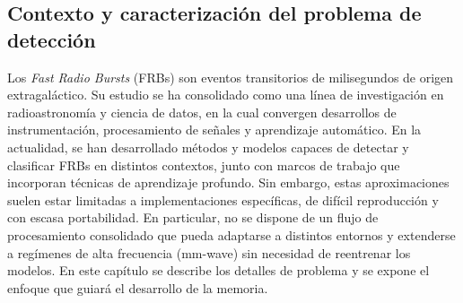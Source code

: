 % 
% 
% 
% 
% 
\subsection{Contexto y caracterización del problema de detección}

Los \textit{Fast Radio Bursts} (FRBs) son  eventos transitorios  de milisegundos de origen extragaláctico. Su estudio se ha consolidado como una línea de investigación en radioastronomía y ciencia de datos, en la cual convergen desarrollos de instrumentación, procesamiento de señales y aprendizaje automático. En la actualidad, se han desarrollado métodos y modelos capaces de detectar y clasificar FRBs en distintos contextos, junto con marcos de trabajo que incorporan técnicas de aprendizaje profundo. Sin embargo, estas aproximaciones suelen estar limitadas a implementaciones específicas, de difícil reproducción y con escasa portabilidad. En particular, no se dispone de un flujo de procesamiento consolidado que pueda adaptarse a distintos entornos y extenderse a regímenes de alta frecuencia (mm-wave) sin necesidad de reentrenar los modelos. En este capítulo se describe los detalles de problema y se expone el enfoque que guiará el desarrollo de la memoria.




